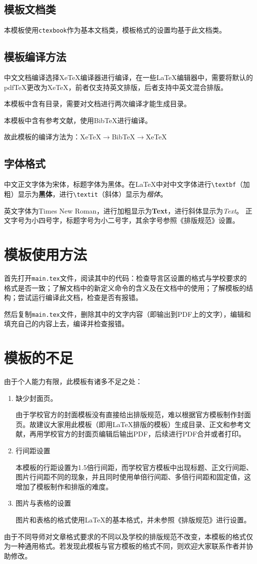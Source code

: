 \documentclass[oneside,zihao=-4]{ctexbook}
\begin{document}
\subsection{模板文档类}
本模板使用\texttt{ctexbook}作为基本文档类，模板格式的设置均基于此文档类。
\subsection{模板编译方法}
中文文档编译选择Xe\TeX{}编译器进行编译，在一些\LaTeX{}编辑器中，需要将默认的pdf\TeX{}更改为Xe\TeX{}，前者仅支持英文排版，后者支持中英文混合排版。\par
本模板中含有目录，需要对文档进行两次编译才能生成目录。\par
本模板中含有参考文献，使用Bib\TeX{}进行编译。\par
故此模板的编译方法为：Xe\TeX{}$\to$Bib\TeX{}$\to$Xe\TeX{}
\subsection{字体格式}
中文正文字体为宋体，标题字体为黑体。在\LaTeX{}中对中文字体进行\texttt{\textbackslash textbf}（加粗）显示为\textbf{黑体}，进行\texttt{\textbackslash textit}（斜体）显示为\textit{楷体}。\par
英文字体为Times New Roman，进行加粗显示为\textbf{Text}，进行斜体显示为\textit{Text}。
正文字号为小四号字，标题字号为小二号字，其余字号参照《排版规范》设置。
\section{模板使用方法}
首先打开\texttt{main.tex}文件，阅读其中的代码：检查导言区设置的格式与学校要求的格式是否一致；了解文档中的新定义命令的含义及在文档中的使用；了解模板的结构；尝试运行编译此文档，检查是否有报错。\par
然后复制\texttt{main.tex}文件，删除其中的文字内容（即输出到PDF上的文字），编辑和填充自己的内容上去，编译并检查报错。
\section{模板的不足}
由于个人能力有限，此模板有诸多不足之处：
\begin{enumerate}
  \item 缺少封面页。\par
  \qquad 由于学校官方的封面模板没有直接给出排版规范，难以根据官方模板制作封面页。故建议大家用此模板（即用\LaTeX{}排版的模板）生成目录、正文和参考文献，再用学校官方的封面页编辑后输出PDF，后续进行PDF合并或者打印。
  \item 行间距设置\par
  \qquad 本模板的行距设置为1.5倍行间距，而学校官方模板中出现标题、正文行间距、图片行间距不同的现象，并且同时使用单倍行间距、多倍行间距和固定值，这增加了模板制作和排版的难度。
  \item 图片与表格的设置\par
  \qquad 图片和表格的格式使用\LaTeX{}的基本格式，并未参照《排版规范》进行设置。
\end{enumerate}\par
由于不同导师对文章格式要求的不同以及学校的排版规范不改变，本模板的格式仅为一种通用格式。若发现此模板与官方模板的格式不同，则欢迎大家联系作者并协助修改。
\end{document}
